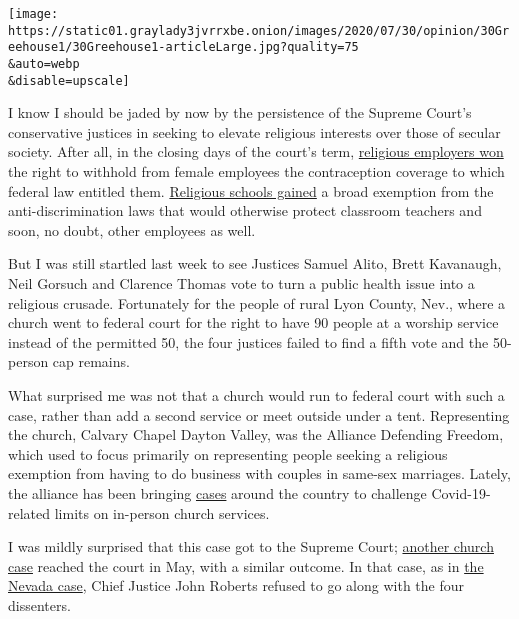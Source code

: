 \texttt{[image: https://static01.graylady3jvrrxbe.onion/images/2020/07/30/opinion/30Greehouse1/30Greehouse1-articleLarge.jpg?quality=75\\\&auto=webp\\\&disable=upscale]}

I know I should be jaded by now by the persistence of the Supreme
Court's conservative justices in seeking to elevate religious interests
over those of secular society. After all, in the closing days of the
court's term,
\href{https://www.supremecourt.gov/opinions/19pdf/19-431_5i36.pdf}{religious
employers won} the right to withhold from female employees the
contraception coverage to which federal law entitled them.
\href{https://www.supremecourt.gov/opinions/19pdf/19-267_1an2.pdf}{Religious
schools gained} a broad exemption from the anti-discrimination laws that
would otherwise protect classroom teachers and soon, no doubt, other
employees as well.

But I was still startled last week to see Justices Samuel Alito, Brett
Kavanaugh, Neil Gorsuch and Clarence Thomas vote to turn a public health
issue into a religious crusade. Fortunately for the people of rural Lyon
County, Nev., where a church went to federal court for the right to have
90 people at a worship service instead of the permitted 50, the four
justices failed to find a fifth vote and the 50-person cap remains.

What surprised me was not that a church would run to federal court with
such a case, rather than add a second service or meet outside under a
tent. Representing the church, Calvary Chapel Dayton Valley, was the
Alliance Defending Freedom, which used to focus primarily on
representing people seeking a religious exemption from having to do
business with couples in same-sex marriages. Lately, the alliance has
been bringing
\href{https://www.adflegal.org/case/calvary-chapel-dayton-valley-v-sisolak}{cases}
around the country to challenge Covid-19-related limits on in-person
church services.

I was mildly surprised that this case got to the Supreme Court;
\href{https://www.supremecourt.gov/DocketPDF/19/19A1044/144133/20200523140701636_Emergency\%20Application\%20for\%20Writ\%20of\%20Injunction.pdf}{another
church case} reached the court in May, with a similar outcome. In that
case, as in
\href{https://www.supremecourt.gov/opinions/19pdf/19a1070_08l1.pdf}{the
Nevada case}, Chief Justice John Roberts refused to go along with the
four dissenters.

